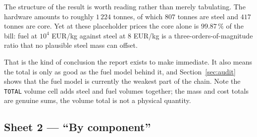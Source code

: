 \documentclass[9pt,a4paper]{extarticle}
\newcommand{\code}[1]{\texttt{\small #1}}
\begin{document}
The structure of the result is worth reading rather than merely tabulating. The
hardware amounts to roughly $1\,224$ tonnes, of which $807$ tonnes are steel and
$417$ tonnes are core. Yet at these placeholder prices the core alone is
$99.87\,\%$ of the bill: fuel at $10^4$ EUR/kg against steel at $8$ EUR/kg is a
three-orders-of-magnitude ratio that no plausible steel mass can offset.

That is the kind of conclusion the report exists to make immediate. It also
means the total is only as good as the fuel model behind it, and
Section~\ref{sec:audit} shows that the fuel model is currently the weakest part
of the chain. Note the \code{TOTAL} volume cell adds steel and fuel volumes
together; the mass and cost totals are genuine sums, the volume total is not a
physical quantity.

\subsection{Sheet 2 --- ``By component''}
\end{document}
